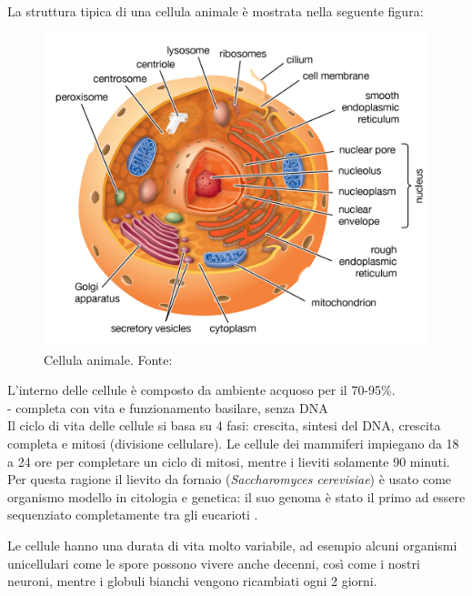 La struttura tipica di una cellula animale è mostrata nella seguente figura:

\begin{figure}[!h]
	\centering
	\includegraphics[scale=0.17]{images/cellula-eucariotica2.png}
	\caption{Cellula animale. Fonte: \cite{eukaryoteBritannica}}
	\label{fig:cellula-animale}
\end{figure}

L'interno delle cellule è composto da ambiente acquoso per il 70-95\%. \\

- completa con vita e funzionamento basilare, senza DNA \\

Il ciclo di vita delle cellule si basa su 4 fasi: crescita, sintesi del DNA, crescita completa e mitosi (divisione cellulare). Le cellule dei mammiferi impiegano da 18 a 24 ore per completare un ciclo di mitosi, mentre i lieviti solamente 90 minuti. Per questa ragione il lievito da fornaio (\textit{Saccharomyces cerevisiae}) è usato come organismo modello in citologia e genetica: il suo genoma è stato il primo ad essere sequenziato completamente tra gli eucarioti \supercite{lievitoWiki}. 

\par Le cellule hanno una durata di vita molto variabile, ad esempio alcuni organismi unicellulari come le spore possono vivere anche decenni, così come i nostri neuroni, mentre i globuli bianchi vengono ricambiati ogni 2 giorni. \\

